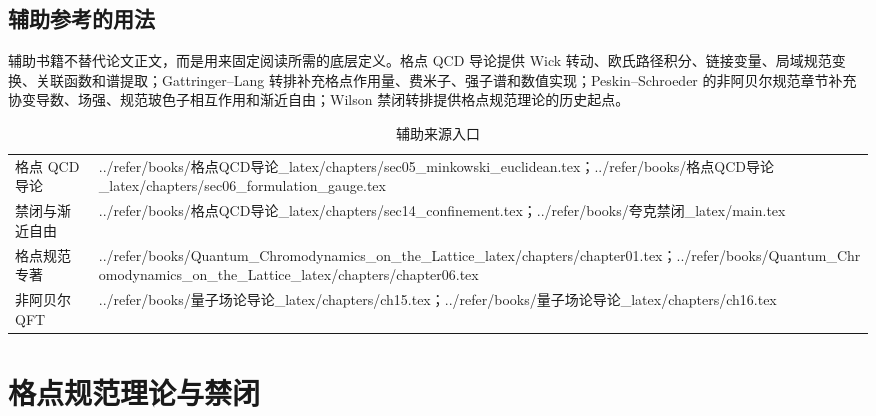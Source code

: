 \documentclass[UTF8,11pt,oneside]{ctexbook}
\begin{document}
\chapter*{辅助参考的用法}
辅助书籍不替代论文正文，而是用来固定阅读所需的底层定义。格点 QCD 导论提供 Wick 转动、欧氏路径积分、链接变量、局域规范变换、关联函数和谱提取；Gattringer–Lang 转排补充格点作用量、费米子、强子谱和数值实现；Peskin–Schroeder 的非阿贝尔规范章节补充协变导数、场强、规范玻色子相互作用和渐近自由；Wilson 禁闭转排提供格点规范理论的历史起点。
\begin{table}[htbp]
  \centering
  \caption{辅助来源入口}
  \small
  \begin{tabularx}{0.96\textwidth}{@{}p{3.3cm}>{\raggedright\arraybackslash}X@{}}
    \toprule
    格点 QCD 导论 & ../\allowbreak{}refer/\allowbreak{}books/\allowbreak{}格点QCD导论\_\allowbreak{}latex/\allowbreak{}chapters/\allowbreak{}sec05\_\allowbreak{}minkowski\_\allowbreak{}euclidean.tex；../\allowbreak{}refer/\allowbreak{}books/\allowbreak{}格点QCD导论\_\allowbreak{}latex/\allowbreak{}chapters/\allowbreak{}sec06\_\allowbreak{}formulation\_\allowbreak{}gauge.tex \\
    禁闭与渐近自由 & ../\allowbreak{}refer/\allowbreak{}books/\allowbreak{}格点QCD导论\_\allowbreak{}latex/\allowbreak{}chapters/\allowbreak{}sec14\_\allowbreak{}confinement.tex；../\allowbreak{}refer/\allowbreak{}books/\allowbreak{}夸克禁闭\_\allowbreak{}latex/\allowbreak{}main.tex \\
    格点规范专著 & ../\allowbreak{}refer/\allowbreak{}books/\allowbreak{}Quantum\_\allowbreak{}Chromodynamics\_\allowbreak{}on\_\allowbreak{}the\_\allowbreak{}Lattice\_\allowbreak{}latex/\allowbreak{}chapters/\allowbreak{}chapter01.tex；../\allowbreak{}refer/\allowbreak{}books/\allowbreak{}Quantum\_\allowbreak{}Chromodynamics\_\allowbreak{}on\_\allowbreak{}the\_\allowbreak{}Lattice\_\allowbreak{}latex/\allowbreak{}chapters/\allowbreak{}chapter06.tex \\
    非阿贝尔 QFT & ../\allowbreak{}refer/\allowbreak{}books/\allowbreak{}量子场论导论\_\allowbreak{}latex/\allowbreak{}chapters/\allowbreak{}ch15.tex；../\allowbreak{}refer/\allowbreak{}books/\allowbreak{}量子场论导论\_\allowbreak{}latex/\allowbreak{}chapters/\allowbreak{}ch16.tex \\
    \bottomrule
  \end{tabularx}
\end{table}
\tableofcontents
\mainmatter

\part{格点规范理论与禁闭}
\end{document}
